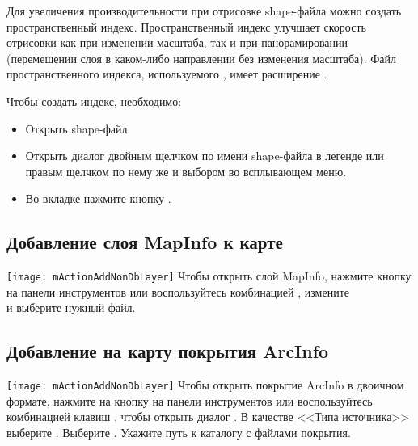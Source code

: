 Для увеличения производительности при отрисовке shape-файла можно создать
пространственный индекс. Пространственный индекс 
улучшает скорость отрисовки как при изменении масштаба, так и при
панорамировании (перемещении слоя в каком-либо направлении без изменения
масштаба). Файл пространственного индекса, используемого \qg, имеет
расширение .

Чтобы создать индекс, необходимо:

\begin{itemize}[label=--]
\item Открыть shape-файл.
\item Открыть диалог  двойным щелчком по имени
shape-файла в легенде или правым щелчком по нему же и выбором
 во всплывающем меню.
\item Во вкладке  нажмите кнопку .
\end{itemize}

\subsection{Добавление слоя MapInfo к карте}

\texttt{[image: mActionAddNonDbLayer]} Чтобы открыть слой
MapInfo, нажмите кнопку  на панели инструментов или воспользуйтесь комбинацией
, измените \\
и выберите нужный файл.

\subsection{Добавление на карту покрытия ArcInfo}

\texttt{[image: mActionAddNonDbLayer]} Чтобы открыть покрытие ArcInfo
в двоичном формате, нажмите на кнопку
 на панели
инструментов или воспользуйтесь комбинацией клавиш ,
чтобы открыть диалог . В качестве
<<Типа источника>> выберите . Выберите
. Укажите путь к каталогу
с файлами покрытия.

